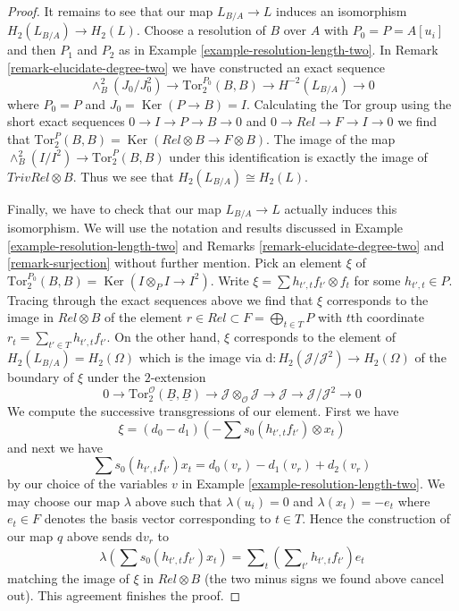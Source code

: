 \documentclass[10pt,a4paper]{amsart}
\theoremstyle{plain}
\theoremstyle{definition}
\theoremstyle{remark}
\numberwithin{equation}{subsection}
\def\Ker{\mathop{\mathrm{Ker}}}
\begin{document}
\begin{proof}
\medskip\noindent
It remains to see that our map $L_{B/A} \to L$ induces an isomorphism
$H_2(L_{B/A}) \to H_2(L)$. Choose a resolution of $B$ over $A$ with
$P_0 = P = A[u_i]$ and then $P_1$ and $P_2$ as in
Example \ref{example-resolution-length-two}.
In Remark \ref{remark-elucidate-degree-two} we have constructed an exact
sequence
$$
\wedge^2_B(J_0/J_0^2) \to \text{Tor}_2^{P_0}(B, B) \to H^{-2}(L_{B/A}) \to 0
$$
where $P_0 = P$ and $J_0 = \Ker(P \to B) = I$.
Calculating the Tor group using the short exact sequences
$0 \to I \to P \to B \to 0$ and $0 \to Rel \to F \to I \to 0$
we find that
$\text{Tor}_2^P(B, B) = \Ker(Rel \otimes B \to F \otimes B)$.
The image of the map $\wedge^2_B(I/I^2) \to \text{Tor}_2^P(B, B)$
under this identification is exactly the image of $TrivRel \otimes B$.
Thus we see that $H_2(L_{B/A}) \cong H_2(L)$.

\medskip\noindent
Finally, we have to check that our map $L_{B/A} \to L$ actually induces
this isomorphism. We will use the notation and results discussed in
Example \ref{example-resolution-length-two} and
Remarks \ref{remark-elucidate-degree-two} and \ref{remark-surjection}
without further mention. Pick an element $\xi$ of
$\text{Tor}_2^{P_0}(B, B) = \Ker(I \otimes_P I \to I^2)$.
Write $\xi = \sum h_{t', t}f_{t'} \otimes f_t$ for some
$h_{t', t} \in P$. Tracing through the exact sequences above we
find that $\xi$ corresponds to the image in $Rel \otimes B$
of the element $r \in Rel \subset F = \bigoplus_{t \in T} P$ with
$t$th coordinate $r_t = \sum_{t' \in T} h_{t', t}f_{t'}$.
On the other hand, $\xi$ corresponds to the element of
$H_2(L_{B/A}) = H_2(\Omega)$ which is the image
via $\text{d} : H_2(\mathcal{J}/\mathcal{J}^2) \to H_2(\Omega)$
of the boundary of $\xi$ under the $2$-extension
$$
0 \to
\text{Tor}_2^\mathcal{O}(\underline{B}, \underline{B})
\to 
\mathcal{J} \otimes_\mathcal{O} \mathcal{J} \to \mathcal{J}
\to
\mathcal{J}/\mathcal{J}^2 \to 0
$$
We compute the successive transgressions of our element. First we have
$$
\xi = (d_0 - d_1)(- \sum s_0(h_{t', t} f_{t'}) \otimes x_t)
$$
and next we have
$$
\sum s_0(h_{t', t} f_{t'}) x_t = d_0(v_r) - d_1(v_r) + d_2(v_r)
$$
by our choice of the variables $v$ in
Example \ref{example-resolution-length-two}.
We may choose our map $\lambda$ above such that
$\lambda(u_i) = 0$ and $\lambda(x_t) = - e_t$ where $e_t \in F$
denotes the basis vector corresponding to $t \in T$.
Hence the construction of our map $q$ above sends $\text{d}v_r$ to
$$
\lambda(\sum s_0(h_{t', t} f_{t'}) x_t) =
\sum\nolimits_t \left(\sum\nolimits_{t'} h_{t', t}f_{t'}\right) e_t
$$
matching the image of $\xi$ in $Rel \otimes B$ (the two minus signs
we found above cancel out). This agreement finishes the proof.
\end{proof}



\end{document}
